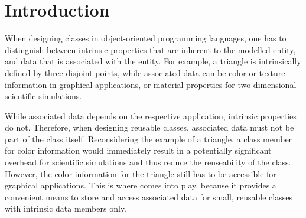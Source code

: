 
\chapter*{Introduction}   

When designing classes in object-oriented programming languages,
one has to distinguish between intrinsic properties that are inherent to the modelled entity,
and data that is associated with the entity. For example, a triangle is intrinsically defined
by three disjoint points, while associated data can be color or texture information in graphical applications, or material properties for two-dimensional scientific simulations.

While associated data depends on the respective application, intrinsic properties do not.
Therefore, when designing reusable classes, associated data must not be part of the class itself.
Reconsidering the example of a triangle, a class member for color information would immediately result in
a potentially significant overhead for scientific simulations and thus reduce the reuseability of the class.
However, the color information for the triangle still has to be accessible for graphical applications. This is where
{\ViennaData} comes into play, because it provides a convenient means to store and access associated data
for small, reusable classes with intrinsic data members only.

